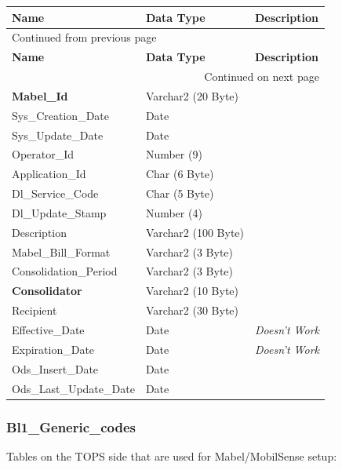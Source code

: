 \documentclass[12pt,twoside]{article}
\begin{document}
\begin{longtable}{l|l|l}
\hline
\textbf{Name} & \textbf{Data Type} & \textbf{Description}\\
\hline
\endfirsthead
\multicolumn{3}{l}{Continued from previous page} \\
\hline

\textbf{Name} & \textbf{Data Type} & \textbf{Description} \\

\hline
\endhead
\hline\multicolumn{3}{r}{Continued on next page} \\
\endfoot
\endlastfoot
\hline
\textbf{Mabel\_Id} & Varchar2 (20 Byte) & \\
Sys\_Creation\_Date & Date & \\
Sys\_Update\_Date & Date & \\
Operator\_Id & Number (9) & \\
Application\_Id & Char (6 Byte) & \\
Dl\_Service\_Code & Char (5 Byte) & \\
Dl\_Update\_Stamp & Number (4) & \\
Description & Varchar2 (100 Byte) & \\
Mabel\_Bill\_Format & Varchar2 (3 Byte) & \\
Consolidation\_Period & Varchar2 (3 Byte) & \\
\textbf{Consolidator} & Varchar2 (10 Byte) & \\
Recipient & Varchar2 (30 Byte) & \\
Effective\_Date & Date & \emph{Doesn't Work}\\
Expiration\_Date & Date & \emph{Doesn't Work}\\
Ods\_Insert\_Date & Date & \\
Ods\_Last\_Update\_Date & Date & \\
\hline
\end{longtable}
\normalsize
\subsubsection{Bl1\_Generic\_codes}
\label{sec:orgheadline142}
Tables on the TOPS side that are used for Mabel/MobilSense setup:
\footnotesize
\end{document}

